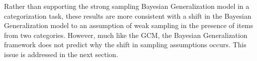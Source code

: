 \documentclass[doc,apacite]{apa6}
\newcommand{\four}{\textsc{Four}}
\newcommand{\random}{\textsc{Twelve Random}}
\newcommand{\helpful}{\textsc{Twelve Helpful}}
\begin{document}
Rather than supporting the strong sampling Bayesian Generalization model in a categorization task, these results are more consistent with a shift in the Bayesian Generalization model to an assumption of weak sampling in the presence of items from two categories.
However, much like the GCM, the Bayesian Generalization framework does not predict why the shift in sampling assumptions occurs. This issue is addressed in the next section.



\end{document}
